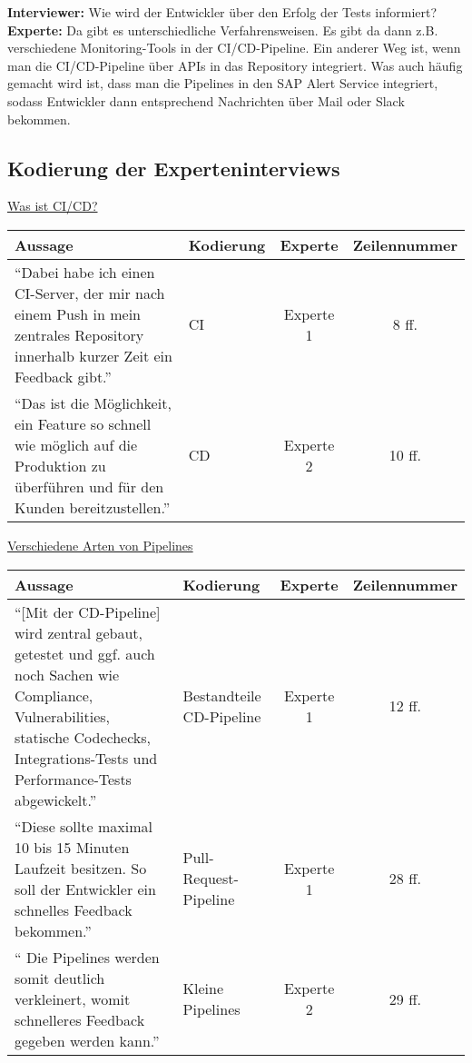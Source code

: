 \begin{linenumbers}
    \textbf{Interviewer:} Wie wird der Entwickler über den Erfolg der Tests informiert?\\
    \textbf{Experte:} Da gibt es unterschiedliche Verfahrensweisen. Es gibt da dann z.B. verschiedene Monitoring-Tools in der CI/CD-Pipeline. Ein anderer Weg ist, wenn man die CI/CD-Pipeline über APIs in das Repository integriert. Was auch häufig gemacht wird ist, dass man die Pipelines in den SAP Alert Service integriert, sodass Entwickler dann entsprechend Nachrichten über Mail oder Slack bekommen.
\end{linenumbers}

\newpage
\subsection{Kodierung der Experteninterviews}
\label{sec:kodierung}
\underline{Was ist CI/CD?}\\
\begin{longtable}{ |C{6cm}|C{3cm}|c|c| }
	\hline
	Aussage & Kodierung & Experte & Zeilennummer\\
	\hline
	\enquote{Dabei habe ich einen CI-Server, der mir nach einem Push in mein zentrales Repository innerhalb kurzer Zeit ein Feedback gibt.} & CI & Experte 1 & 8 ff. \\
	\hline
	\enquote{Das ist die Möglichkeit, ein Feature so schnell wie möglich auf die Produktion zu überführen und für den Kunden bereitzustellen.} & CD & Experte 2 & 10 ff. \\
	\hline
	\end{longtable}

\underline{Verschiedene Arten von Pipelines}\\
\begin{longtable}{ |C{6cm}|C{3cm}|c|c| }
	\hline
	Aussage & Kodierung & Experte & Zeilennummer\\
	\hline
	\enquote{[Mit der CD-Pipeline] wird zentral gebaut, getestet und ggf. auch noch Sachen wie Compliance, Vulnerabilities, statische Codechecks, Integrations-Tests und Performance-Tests abgewickelt.} & Bestandteile CD-Pipeline  & Experte 1 & 12 ff. \\
	\hline
	\enquote{Diese sollte maximal 10 bis 15 Minuten Laufzeit besitzen. So soll der Entwickler ein schnelles Feedback bekommen.} & Pull-Request-Pipeline & Experte 1 & 28 ff. \\
	\hline
    \enquote{ Die Pipelines werden somit deutlich verkleinert, womit schnelleres Feedback gegeben werden kann.} & Kleine Pipelines & Experte 2 & 29 ff. \\
	\hline
	\end{longtable}



